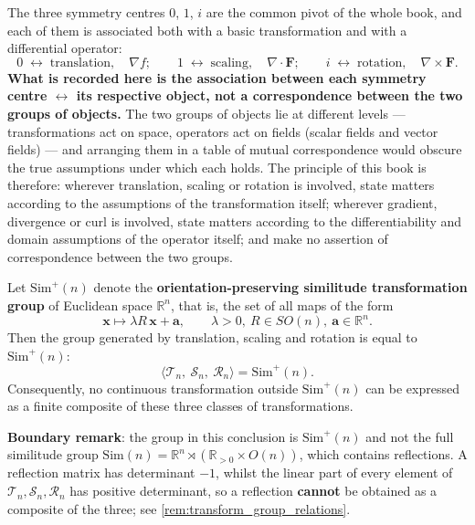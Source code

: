 \begin{remark}\label{rem:centres_and_two_triples}
The three symmetry centres $0$, $1$, $i$ are the common pivot of the whole book, and each of them is associated both with a basic transformation and with a differential operator:
\[
0 \;\longleftrightarrow\; \text{translation},\quad \nabla f;
\qquad
1 \;\longleftrightarrow\; \text{scaling},\quad \nabla\cdot\mathbf{F};
\qquad
i \;\longleftrightarrow\; \text{rotation},\quad \nabla\times\mathbf{F}.
\]
\textbf{What is recorded here is the association between each symmetry centre $\leftrightarrow$ its respective object, not a correspondence between the two groups of objects.} The two groups of objects lie at different levels --- transformations act on space, operators act on fields (scalar fields and vector fields) --- and arranging them in a table of mutual correspondence would obscure the true assumptions under which each holds. The principle of this book is therefore: wherever translation, scaling or rotation is involved, state matters according to the assumptions of the transformation itself; wherever gradient, divergence or curl is involved, state matters according to the differentiability and domain assumptions of the operator itself; and make no assertion of correspondence between the two groups.
\end{remark}

\begin{proposition}\label{prop:similitude_group}
Let $\mathrm{Sim}^{+}(n)$ denote the \textbf{orientation-preserving similitude transformation group} of Euclidean space $\mathbb R^n$, that is, the set of all maps of the form
\[
\mathbf x \mapsto \lambda R\,\mathbf x + \mathbf a, \qquad \lambda>0,\ R\in SO(n),\ \mathbf a\in\mathbb R^n .
\]
Then the group generated by translation, scaling and rotation is equal to $\mathrm{Sim}^{+}(n)$:
\[
\langle \mathcal{T}_n,\ \mathcal{S}_n,\ \mathcal{R}_n\rangle = \mathrm{Sim}^{+}(n).
\]
Consequently, no continuous transformation outside $\mathrm{Sim}^{+}(n)$ can be expressed as a finite composite of these three classes of transformations.

\textbf{Boundary remark}: the group in this conclusion is $\mathrm{Sim}^{+}(n)$ and not the full similitude group $\mathrm{Sim}(n)=\mathbb R^n\rtimes(\mathbb R_{>0}\times O(n))$, which contains reflections. A reflection matrix has determinant $-1$, whilst the linear part of every element of $\mathcal T_n,\mathcal S_n,\mathcal R_n$ has positive determinant, so a reflection \textbf{cannot} be obtained as a composite of the three; see \cref{rem:transform_group_relations}.
\end{proposition}

